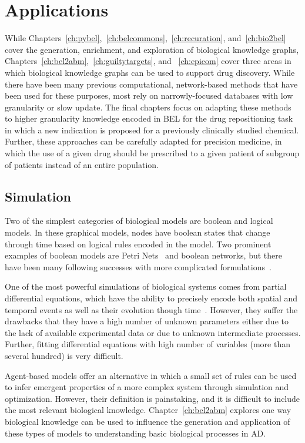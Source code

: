 \section{Applications}
\label{sec:introduction_applications}

While Chapters~\ref{ch:pybel},~\ref{ch:belcommons},~\ref{ch:recuration}, and~\ref{ch:bio2bel} cover the generation, enrichment, and exploration of biological knowledge graphs, Chapters~\ref{ch:bel2abm},~\ref{ch:guiltytargets}, and ~\ref{ch:epicom} cover three areas in which biological knowledge graphs can be used to support drug discovery.
While there have been many previous computational, network-based methods that have been used for these purposes, most rely on narrowly-focused databases with low granularity or slow update.
The final chapters focus on adapting these methods to higher granularity knowledge encoded in BEL for the drug repositioning task in which a new indication is proposed for a previously clinically studied chemical.
Further, these approaches can be carefully adapted for precision medicine, in which the use of a given drug should be prescribed to a given patient of subgroup of patients instead of an entire population.

\subsection{Simulation}

Two of the simplest categories of biological models are boolean and logical models.
In these graphical models, nodes have boolean states that change through time based on logical rules encoded in the model.
Two prominent examples of boolean models are Petri Nets~\cite{Peterson1977} and boolean networks\cite{Albert2008}, but there have been many following successes with more complicated formulations~\cite{Saez-Rodriguez2011,Gyori2017,Karlebach2008}.

One of the most powerful simulations of biological systems comes from partial differential equations, which have the ability to precisely encode both spatial and temporal events as well as their evolution though time~\cite{Lopez2013}.
However, they suffer the drawbacks that they have a high number of unknown parameters either due to the lack of available experimental data or due to unknown intermediate processes.
Further, fitting differential equations with high number of variables (more than several hundred) is very difficult.

Agent-based models offer an alternative in which a small set of rules can be used to infer emergent properties of a more complex system through simulation and optimization.
However, their definition is painstaking, and it is difficult to include the most relevant biological knowledge.
Chapter~\ref{ch:bel2abm} explores one way biological knowledge can be used to influence the generation and application of these types of models to understanding basic biological processes in \ac{AD}.

